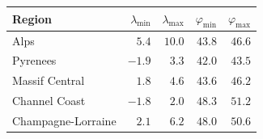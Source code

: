 \begin{tabular}{@{}lrrrr@{}}
\toprule
Region & $\lambda_{\min}$ & $\lambda_{\max}$ & $\varphi_{\min}$ & $\varphi_{\max}$ \\
\midrule
Alps & $5.4$ & $10.0$ & $43.8$ & $46.6$ \\
Pyrenees & $-1.9$ & $3.3$ & $42.0$ & $43.5$ \\
Massif Central & $1.8$ & $4.6$ & $43.6$ & $46.2$ \\
Channel Coast & $-1.8$ & $2.0$ & $48.3$ & $51.2$ \\
Champagne-Lorraine & $2.1$ & $6.2$ & $48.0$ & $50.6$ \\
\bottomrule
\end{tabular}
